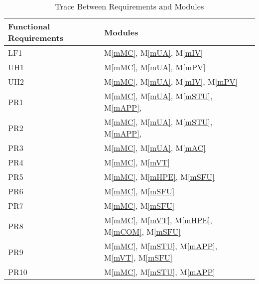 \documentclass[12pt, titlepage]{article}
\newcommand{\mref}[1]{M\ref{#1}}
\begin{document}
\begin{table}[H]
\centering
\begin{tabular}{p{} p{}}
\toprule
\textbf{Functional Requirements} & \textbf{Modules}\\
\midrule
LF1 & \mref{mMC}, \mref{mUA}, \mref{mIV}\\
UH1 & \mref{mMC}, \mref{mUA}, \mref{mPV}\\
UH2 & \mref{mMC}, \mref{mUA}, \mref{mIV}, \mref{mPV}\\
PR1 & \mref{mMC}, \mref{mUA}, \mref{mSTU}, \mref{mAPP},\\
PR2 & \mref{mMC}, \mref{mUA}, \mref{mSTU}, \mref{mAPP},\\
PR3 & \mref{mMC}, \mref{mUA}, \mref{mAC}\\
PR4 & \mref{mMC}, \mref{mVT}\\
PR5 & \mref{mMC}, \mref{mHPE}, \mref{mSFU}\\
PR6 & \mref{mMC}, \mref{mSFU}\\
PR7 & \mref{mMC}, \mref{mSFU}\\
PR8 & \mref{mMC}, \mref{mVT}, \mref{mHPE}, \mref{mCOM}, \mref{mSFU}\\
PR9 & \mref{mMC}, \mref{mSTU}, \mref{mAPP}, \mref{mVT}, \mref{mSFU}\\
PR10 & \mref{mMC}, \mref{mSTU}, \mref{mAPP}\\
\bottomrule
\end{tabular}
\caption{Trace Between Requirements and Modules}
\label{TblRT}
\end{table}
\end{document}
